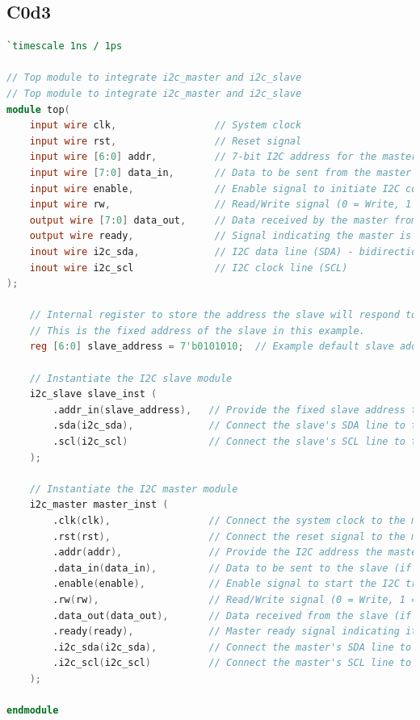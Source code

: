 \documentclass[a4paper,12pt]{report}
\begin{document}
\subsection{C0d3}

\begin{lstlisting}[language=Verilog, caption={Top Module for Integrating I2C Master and Slave}, label=lst:top_module]
`timescale 1ns / 1ps

// Top module to integrate i2c_master and i2c_slave
// Top module to integrate i2c_master and i2c_slave
module top(
    input wire clk,                 // System clock
    input wire rst,                 // Reset signal
    input wire [6:0] addr,          // 7-bit I2C address for the master to communicate with
    input wire [7:0] data_in,       // Data to be sent from the master to the slave
    input wire enable,              // Enable signal to initiate I2C communication
    input wire rw,                  // Read/Write signal (0 = Write, 1 = Read)
    output wire [7:0] data_out,     // Data received by the master from the slave
    output wire ready,              // Signal indicating the master is ready for a new operation
    inout wire i2c_sda,             // I2C data line (SDA) - bidirectional
    inout wire i2c_scl              // I2C clock line (SCL)
);

    // Internal register to store the address the slave will respond to.
    // This is the fixed address of the slave in this example.
    reg [6:0] slave_address = 7'b0101010;  // Example default slave address

    // Instantiate the I2C slave module
    i2c_slave slave_inst (
        .addr_in(slave_address),   // Provide the fixed slave address to the slave instance
        .sda(i2c_sda),             // Connect the slave's SDA line to the top-level SDA
        .scl(i2c_scl)              // Connect the slave's SCL line to the top-level SCL
    );

    // Instantiate the I2C master module
    i2c_master master_inst (
        .clk(clk),                 // Connect the system clock to the master
        .rst(rst),                 // Connect the reset signal to the master
        .addr(addr),               // Provide the I2C address the master should communicate with
        .data_in(data_in),         // Data to be sent to the slave (if writing)
        .enable(enable),           // Enable signal to start the I2C transaction
        .rw(rw),                   // Read/Write signal (0 = Write, 1 = Read)
        .data_out(data_out),       // Data received from the slave (if reading)
        .ready(ready),             // Master ready signal indicating it's idle or ready for a new transaction
        .i2c_sda(i2c_sda),         // Connect the master's SDA line to the top-level SDA
        .i2c_scl(i2c_scl)          // Connect the master's SCL line to the top-level SCL
    );

endmodule
\end{lstlisting}
\newpage
\end{document}
